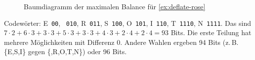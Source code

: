 \begin{myexercise}
\begin{myanswer}
\begin{aenum}
\begin{figure}[H]
			      	\caption{Baumdiagramm der maximalen Balance für \cref{ex:deflate-rose}}
			      	\label{fig:maxbal-rose}
			      \end{figure}
			      Codewörter: E~\texttt{00}, \textvisiblespace~\texttt{010}, R~\texttt{011}, S~\texttt{100}, O~\texttt{101}, I~\texttt{110}, T~\texttt{1110}, N~\texttt{1111}. Das sind $7\cdot2 + 6\cdot3 + 3\cdot3 + 5\cdot3 + 3\cdot3 + 4\cdot3 + 2\cdot4 + 2\cdot4 = 93$ Bits. Die erste Teilung hat mehrere Möglichkeiten mit Differenz 0. Andere Wahlen ergeben 94 Bits (z.\,B. \{E,S,I\} gegen \{\textvisiblespace,R,O,T,N\}) oder 96 Bits.
		\end{aenum}
	\end{myanswer}


\end{myexercise}
